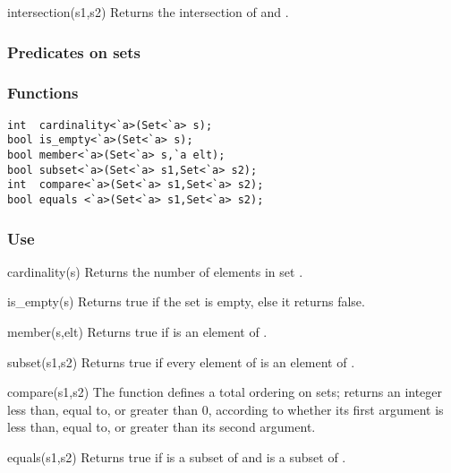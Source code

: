 \begin{defun}{intersection}{(s1,s2)}
Returns the intersection of  and .
\end{defun}

\subsubsection*{Predicates on sets}
\subsubsection*{Functions}
\begin{verbatim}
int  cardinality<`a>(Set<`a> s);
bool is_empty<`a>(Set<`a> s);
bool member<`a>(Set<`a> s,`a elt);
bool subset<`a>(Set<`a> s1,Set<`a> s2);
int  compare<`a>(Set<`a> s1,Set<`a> s2);
bool equals <`a>(Set<`a> s1,Set<`a> s2);
\end{verbatim}

\subsubsection*{Use}

\begin{defun}{cardinality}{(s)}
Returns the number of elements in set .
\end{defun}

\begin{defun}{is_empty}{(s)}
Returns true if the set  is empty, else it returns false.
\end{defun}

\begin{defun}{member}{(s,elt)}
Returns true if  is an element of .
\end{defun}

\begin{defun}{subset}{(s1,s2)}
Returns true if every element of  is an element of .
\end{defun}

\begin{defun}{compare}{(s1,s2)}
The function  defines a total ordering on sets;
 returns an integer less than, equal
to, or greater than 0, according to whether its first argument is less
than, equal to, or greater than its second argument.
\end{defun}

\begin{defun}{equals}{(s1,s2)}
Returns true if  is a subset of  and  is a
subset of .
\end{defun}

